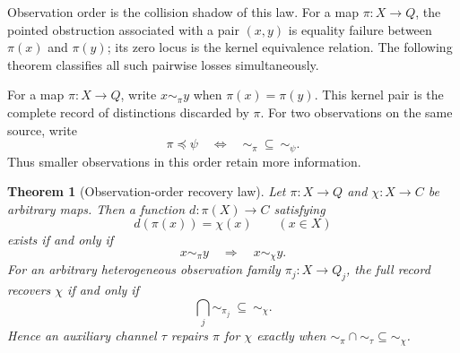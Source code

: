 \documentclass[11pt]{article}
\newtheorem{theorem}{Theorem}[section]
\theoremstyle{definition}
\theoremstyle{remark}
\begin{document}
Observation order is the collision shadow of this law.  For a map
\(\pi:X\to Q\), the pointed obstruction associated with a pair \((x,y)\)
is equality failure between \(\pi(x)\) and \(\pi(y)\); its zero locus is the
kernel equivalence relation.  The following theorem classifies all such
pairwise losses simultaneously.

For a map \(\pi:X\to Q\), write \(x\sim_\pi y\) when
\(\pi(x)=\pi(y)\).  This kernel pair is the complete record of distinctions
discarded by \(\pi\).  For two observations on the same source, write
\[
       \pi\preccurlyeq\psi
       \quad\Longleftrightarrow\quad
       {\sim_\pi}\ \subseteq\ {\sim_\psi}.
\tag{2.K0}\label{eq:observation-order}
\]
Thus smaller observations in this order retain more information.

\begin{theorem}[Observation-order recovery law]
\label{thm:kernel-pair-law}
Let \(\pi:X\to Q\) and \(\chi:X\to C\) be arbitrary maps.
Then a function \(d:\pi(X)\to C\) satisfying
\[
                         d(\pi(x))=\chi(x)\qquad(x\in X)
\tag{2.K1}\label{eq:range-factorization}
\]
exists if and only if
\[
                         x\sim_\pi y\quad\Longrightarrow\quad
                         x\sim_\chi y.
\tag{2.K2}\label{eq:kernel-refinement}
\]
For an arbitrary heterogeneous observation family
\(\pi_j:X\to Q_j\), the full record recovers \(\chi\) if and only if
\[
             \bigcap_j\sim_{\pi_j}\ \subseteq\ \sim_\chi.
\tag{2.K3}\label{eq:family-kernel-refinement}
\]
Hence an auxiliary channel \(\tau\) repairs \(\pi\) for \(\chi\) exactly
when \(\sim_\pi\cap\sim_\tau\subseteq\sim_\chi\).


\end{theorem}
\end{document}
